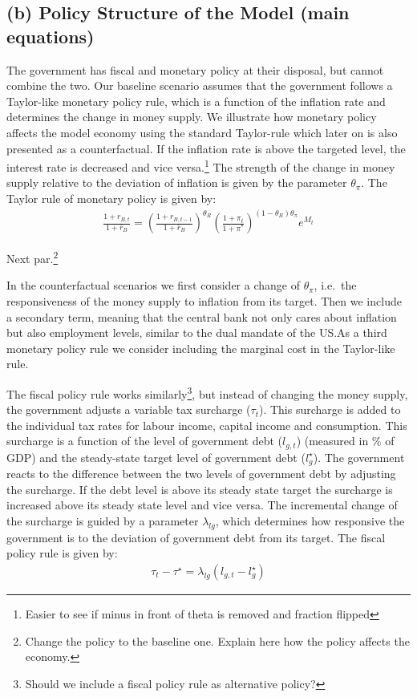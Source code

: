 \documentclass[12pt]{article}
\begin{document}
\subsection*{(b) Policy Structure of the Model (main equations)}
The government has fiscal and monetary policy at their disposal, but cannot combine the two. Our baseline scenario assumes that the government
follows a Taylor-like monetary policy rule, which is a function of the inflation rate and determines the change in money supply. We illustrate how monetary policy affects the model economy using the standard Taylor-rule which later on is also presented as a counterfactual. If the inflation rate is above the targeted level, the interest rate is decreased and vice versa.\footnote{Easier to see if minus in front of theta is removed and fraction flipped} The strength of the change in money supply relative to the deviation of inflation is given by the parameter $\theta_{\pi}$. 
The Taylor rule of monetary policy is given by:
\begin{align}
    \frac{1 + r_{B,t}}{1 + \bar{r}_B} = \left( \frac{1 + r_{B,t-1}}{1 + \bar{r}_B} \right)^{\theta_R} \left( \frac{1 + \pi_t}{1 + \pi^*} \right)^{(1 - \theta_R)\theta_{\pi}}
e^{M_t}
\end{align}

Next par.\footnote{Change the policy to the baseline one. Explain here how the policy affects the economy.}

In the counterfactual scenarios we first consider a change of $\theta_\pi$, i.e.~the responsiveness of the money supply to inflation from its target. Then we include a secondary term, meaning that the central bank not only cares about inflation but also employment levels, similar to the dual mandate of the US.\@ As a third monetary policy rule we consider including the marginal cost in the Taylor-like rule.

The fiscal policy rule works similarly\footnote{Should we include a fiscal policy rule as alternative policy?}, but instead of changing the money supply, the government adjusts a variable tax surcharge ($\tau_t$). This surcharge is added to the individual tax rates for labour income, capital income and consumption. This surcharge is a function of the level of government debt ($l_{g,t}$) (measured in \% of GDP) and the steady-state target level of government debt ($l^{\star}_{g}$). The government reacts to the difference between the two levels of government debt by adjusting the surcharge. If the debt level is above its steady state target the surcharge is increased above its steady state level and vice versa. The incremental change of the surcharge is guided by a parameter $\lambda_{l g}$, which determines how responsive the government is to the deviation of government debt from its target. The fiscal policy rule is given by:
\begin{align}
    \tau_t - \tau^{\star} = \lambda_{l g} (l_{g,t} - l^{\star}_{g})
\end{align}
\end{document}
